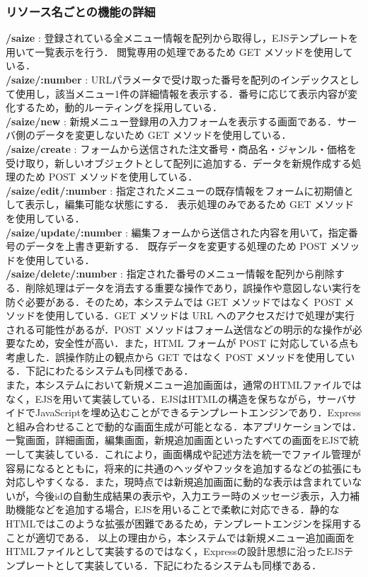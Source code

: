 \documentclass[uplatex,dvipdfmx]{jsarticle}
\begin{document}
\subsubsection{リソース名ごとの機能の詳細}
\textbf{/saize} : 登録されている全メニュー情報を配列から取得し，EJSテンプレートを用いて一覧表示を行う．
閲覧専用の処理であるため GET メソッドを使用している．\\
\textbf{/saize/:number} : URLパラメータで受け取った番号を配列のインデックスとして使用し，該当メニュー1件の詳細情報を表示する．番号に応じて表示内容が変化するため，動的ルーティングを採用している．\\
\textbf{/saize/new} : 新規メニュー登録用の入力フォームを表示する画面である．サーバ側のデータを変更しないため GET メソッドを使用している．\\
\textbf{/saize/create} : フォームから送信された注文番号・商品名・ジャンル・価格を受け取り，新しいオブジェクトとして配列に追加する．データを新規作成する処理のため POST メソッドを使用している．\\
\textbf{/saize/edit/:number} : 指定されたメニューの既存情報をフォームに初期値として表示し，編集可能な状態にする．
表示処理のみであるため GET メソッドを使用している．\\
\textbf{/saize/update/:number} : 編集フォームから送信された内容を用いて，指定番号のデータを上書き更新する．
既存データを変更する処理のため POST メソッドを使用している．\\
\textbf{/saize/delete/:number} : 指定された番号のメニュー情報を配列から削除する．削除処理はデータを消去する重要な操作であり，誤操作や意図しない実行を防ぐ必要がある．そのため，本システムでは GET メソッドではなく POST メソッドを使用している．GET メソッドは URL へのアクセスだけで処理が実行される可能性があるが．POST メソッドはフォーム送信などの明示的な操作が必要なため，安全性が高い．また，HTML フォームが POST に対応している点も考慮した．誤操作防止の観点から GET ではなく POST メソッドを使用している．下記にわたるシステムも同様である．\\

また，本システムにおいて新規メニュー追加画面は，通常のHTMLファイルではなく，EJSを用いて実装している．EJSはHTMLの構造を保ちながら，サーバサイドでJavaScriptを埋め込むことができるテンプレートエンジンであり．Expressと組み合わせることで動的な画面生成が可能となる．本アプリケーションでは．一覧画面，詳細画面，編集画面，新規追加画面といったすべての画面をEJSで統一して実装している．これにより，画面構成や記述方法を統一でファイル管理が容易になるとともに，将来的に共通のヘッダやフッタを追加するなどの拡張にも対応しやすくなる．また，現時点では新規追加画面に動的な表示は含まれていないが，今後idの自動生成結果の表示や，入力エラー時のメッセージ表示，入力補助機能などを追加する場合，EJSを用いることで柔軟に対応できる．静的なHTMLではこのような拡張が困難であるため，テンプレートエンジンを採用することが適切である．
以上の理由から，本システムでは新規メニュー追加画面をHTMLファイルとして実装するのではなく，Expressの設計思想に沿ったEJSテンプレートとして実装している．下記にわたるシステムも同様である．
\end{document}
